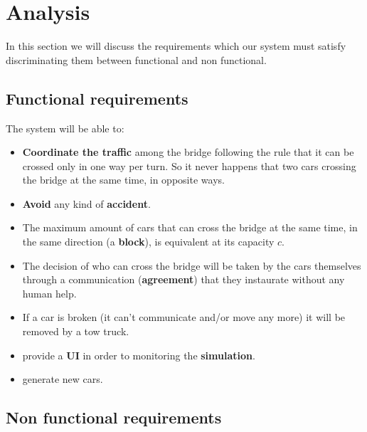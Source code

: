 \chapter{Analysis}\label{ch:analysis}

In this section we will discuss the requirements which our system must satisfy 
discriminating them between functional and non functional.

\section{Functional requirements}

The system will be able to:
\begin{itemize}
    \item \textbf{Coordinate the traffic} among the bridge following the rule 
        that it can be crossed only in one way per turn. 
        So it never happens that two cars crossing the bridge at the same time, 
        in opposite ways.
    \item \textbf{Avoid} any kind of \textbf{accident}.
    \item The maximum amount of cars that can cross the bridge at the same time, 
        in the same direction (a \textbf{block}), is equivalent at its capacity $c$.
    \item The decision of who can cross the bridge will be taken by the cars 
        themselves through a communication (\textbf{agreement}) that they 
        instaurate without any human help.
    \item If a car is broken (it can’t communicate and/or move any more) 
        it will be removed by a tow truck.
    \item provide a \textbf{UI} in order to monitoring the \textbf{simulation}.
    \item generate new cars.
\end{itemize}


\section{Non functional requirements}

